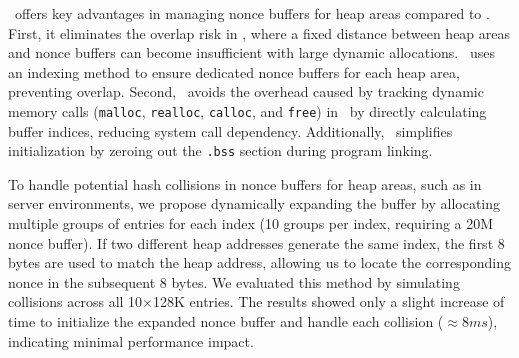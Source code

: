 \tool\ offers key advantages in managing nonce buffers for heap areas compared to \ftool. 
First, it eliminates the overlap risk in \ftool, where a fixed distance between heap areas and nonce buffers can become insufficient with large dynamic allocations. 
\tool\ uses an indexing method to ensure dedicated nonce buffers for each heap area, preventing overlap. 
Second, \tool\ avoids the overhead caused by tracking dynamic memory calls (\texttt{malloc}, \texttt{realloc}, \texttt{calloc}, and \texttt{free}) in \ftool\ by directly calculating buffer indices, reducing system call dependency. 
Additionally, \tool\ simplifies initialization by zeroing out the \texttt{.bss} section during program linking.

To handle potential hash collisions in nonce buffers for heap areas, such as in server environments, we propose dynamically expanding the buffer by allocating multiple groups of entries for each index (10 groups per index, requiring a 20M nonce buffer). 
If two different heap addresses generate the same index, the first 8 bytes are used to match the heap address, allowing us to locate the corresponding nonce in the subsequent 8 bytes. 
We evaluated this method by simulating collisions across all 10$\times$128K entries. The results showed only a slight increase of time to initialize the expanded nonce buffer and handle each collision ($\approx 8 ms$), indicating minimal performance impact.

